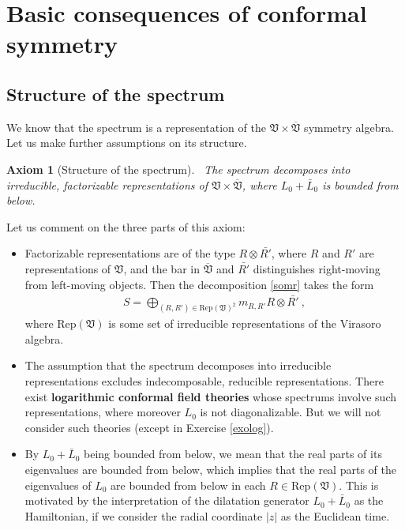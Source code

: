 \documentclass[12pt, a4paper, notitlepage, twoside]{report}
\numberwithin{equation}{section}
\theoremstyle{break}
\newtheorem{hyp}{Axiom}[chapter]
\begin{document}
\section{Basic consequences of conformal symmetry}

\subsection{Structure of the spectrum \label{secsots}}

We know that the spectrum is a representation of the 
$\mathfrak{V}\times \overline{\mathfrak{V}}$ symmetry algebra.
Let us make further assumptions on its structure.

\begin{hyp}[Structure of the spectrum]
 ~\label{ax:sots}
 The spectrum decomposes into irreducible, factorizable representations of $\mathfrak{V}\times \overline{\mathfrak{V}}$, where $L_0+\bar L_0$ is bounded from below.
\end{hyp} 
\noindent
Let us comment on the three parts of this axiom:
\begin{itemize}
 \item 
 Factorizable representations are of the type $R\otimes \bar{R'}$, where $R$ and $R'$ are representations of $\mathfrak{V}$, and the bar in $\overline{\mathfrak{V}}$ and $\bar{R'}$ distinguishes right-moving from left-moving objects. 
Then the decomposition \eqref{somr} takes the form
\begin{align}
 \boxed{S = \bigoplus_{(R,R')\in \text{Rep}(\mathfrak{V})^2} m_{R,R'} R\otimes \bar{R'}}\ ,
\label{sorr}
\end{align}
where $\text{Rep}(\mathfrak{V})$ is some set of irreducible representations of the Virasoro algebra.
\item
The assumption that the spectrum decomposes into irreducible representations excludes indecomposable, reducible representations. 
There exist \textbf{\boldmath logarithmic conformal field theories} whose spectrums involve such representations, where moreover $L_0$ is not diagonalizable. 
But we will not consider such theories (except in Exercise \ref{exolog}).
\item 
By $L_0+\bar L_0$ being bounded from below, we mean that the real parts of its eigenvalues are bounded from below, which implies that the real parts of the eigenvalues of $L_0$ are bounded from below in each $R\in\text{Rep}(\mathfrak{V})$. 
This is motivated by the interpretation of the dilatation generator $L_0+\bar L_0$ as the Hamiltonian, if we consider the radial coordinate $|z|$ as the Euclidean time. 
\end{itemize}
\end{document}
